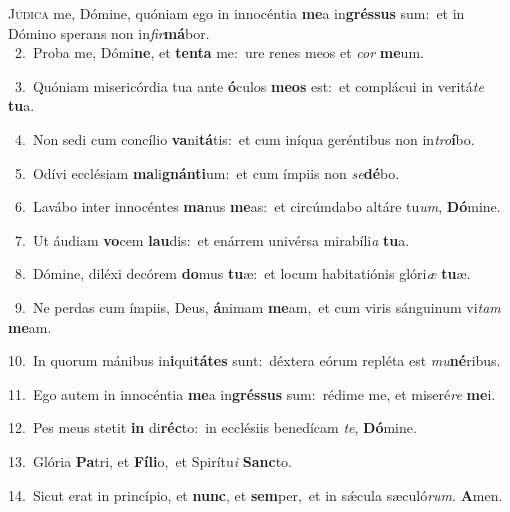 \lettrine{\initial\textcolor{\initialcolor}{J}}{údica} me, Dómine, quóniam ego in innocéntia \textbf{me}\-a in\-\textbf{grés}\-\textbf{sus} sum:~\star et in Dómino sperans non in\-\textit{fir}\-\textbf{má}bor.\\
{\numbfont\textcolor{\numbcolor}{~2.}}~Proba me, Dómi\-\textbf{ne}\-, et \textbf{ten}\-\textbf{ta} me:~\star ure renes meos et \textit{cor} \textbf{me}\-um.\par
{\numbfont\textcolor{\numbcolor}{~3.}}~Quóniam misericórdia tua ante \textbf{ó}\-culos \textbf{me}\-\textbf{os} est:~\star et complácui in veritá\textit{te} \textbf{tu}\-a.\par
{\numbfont\textcolor{\numbcolor}{~4.}}~Non sedi cum concílio \textbf{va}\-ni\-\textbf{tá}\-tis:~\star et cum iníqua geréntibus non in\-\textit{tro}\-\textbf{í}bo.\par
{\numbfont\textcolor{\numbcolor}{~5.}}~Odívi ecclésiam \textbf{ma}\-li\-\textbf{gnán}\-\textbf{ti}um:~\star et cum ímpiis non \textit{se}\-\textbf{dé}bo.\par
{\numbfont\textcolor{\numbcolor}{~6.}}~Lavábo inter innocéntes \textbf{ma}\-nus \textbf{me}\-as:~\star et circúmdabo altáre tu\-\textit{um}\-, \textbf{Dó}\-mine.\par
{\numbfont\textcolor{\numbcolor}{~7.}}~Ut áudiam \textbf{vo}\-cem \textbf{lau}\-dis:~\star et enárrem univérsa mirabíli\textit{a} \textbf{tu}\-a.\par
{\numbfont\textcolor{\numbcolor}{~8.}}~Dómine, diléxi decórem \textbf{do}\-mus \textbf{tu}\-æ:~\star et locum habitatiónis glóri\textit{æ} \textbf{tu}\-æ.\par
{\numbfont\textcolor{\numbcolor}{~9.}}~Ne perdas cum ímpiis, Deus, \textbf{á}\-nimam \textbf{me}\-am,~\star et cum viris sánguinum vi\textit{tam} \textbf{me}\-am.\par
{\numbfont\textcolor{\numbcolor}{10.}}~In quorum mánibus in\-\textbf{i}\-qui\-\textbf{tá}\-\textbf{tes} sunt:~\star déxtera eórum repléta est \textit{mu}\-\textbf{né}ribus.\par
{\numbfont\textcolor{\numbcolor}{11.}}~Ego autem in innocéntia \textbf{me}\-a in\-\textbf{grés}\-\textbf{sus} sum:~\star rédime me, et miseré\textit{re} \textbf{me}\-i.\par
{\numbfont\textcolor{\numbcolor}{12.}}~Pes meus stetit \textbf{in} di\-\textbf{réc}\-to:~\star in ecclésiis benedícam \textit{te}\-, \textbf{Dó}\-mine.\par
{\numbfont\textcolor{\numbcolor}{13.}}~Glória \textbf{Pa}\-tri, et \textbf{Fí}\-\textbf{li}o,~\star et Spirítu\textit{i} \textbf{Sanc}\-to.\par
{\numbfont\textcolor{\numbcolor}{14.}}~Sicut erat in princípio, et \textbf{nunc}\-, et \textbf{sem}\-per,~\star et in sǽcula sæculó\-\textit{rum}\-. \textbf{A}\-men.\par
